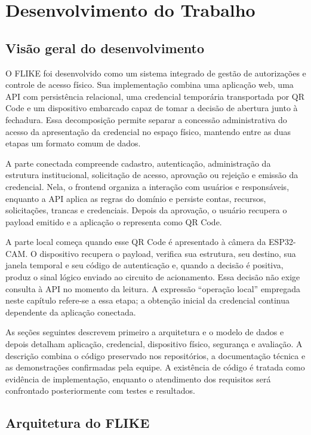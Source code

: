\chapter{Desenvolvimento do Trabalho} \label{cap:desenvolvimento}

\section{Visão geral do desenvolvimento}

O FLIKE foi desenvolvido como um sistema integrado de gestão de autorizações e controle de acesso físico. Sua implementação combina uma aplicação web, uma API com persistência relacional, uma credencial temporária transportada por QR Code e um dispositivo embarcado capaz de tomar a decisão de abertura junto à fechadura. Essa decomposição permite separar a concessão administrativa do acesso da apresentação da credencial no espaço físico, mantendo entre as duas etapas um formato comum de dados.

A parte conectada compreende cadastro, autenticação, administração da estrutura institucional, solicitação de acesso, aprovação ou rejeição e emissão da credencial. Nela, o frontend organiza a interação com usuários e responsáveis, enquanto a API aplica as regras do domínio e persiste contas, recursos, solicitações, trancas e credenciais. Depois da aprovação, o usuário recupera o payload emitido e a aplicação o representa como QR Code.

A parte local começa quando esse QR Code é apresentado à câmera da ESP32-CAM. O dispositivo recupera o payload, verifica sua estrutura, seu destino, sua janela temporal e seu código de autenticação e, quando a decisão é positiva, produz o sinal lógico enviado ao circuito de acionamento. Essa decisão não exige consulta à API no momento da leitura. A expressão ``operação local'' empregada neste capítulo refere-se a essa etapa; a obtenção inicial da credencial continua dependente da aplicação conectada.

As seções seguintes descrevem primeiro a arquitetura e o modelo de dados e depois detalham aplicação, credencial, dispositivo físico, segurança e avaliação. A descrição combina o código preservado nos repositórios, a documentação técnica e as demonstrações confirmadas pela equipe. A existência de código é tratada como evidência de implementação, enquanto o atendimento dos requisitos será confrontado posteriormente com testes e resultados.

\section{Arquitetura do FLIKE}

